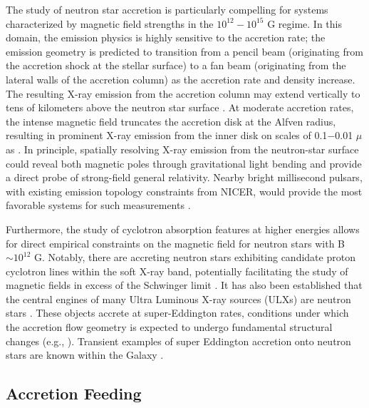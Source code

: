 \documentclass{article}
\begin{document}
The study of neutron star accretion is particularly compelling for systems
characterized by magnetic field strengths in the $10^{12} - 10^{15}$ G regime. In this domain, the
emission physics is highly sensitive to the accretion rate; the emission geometry is
predicted to transition from a pencil beam (originating from the accretion shock at the
stellar surface) to a fan beam (originating from the lateral walls of the accretion
column) as the accretion rate and density increase. The resulting X-ray emission from the
accretion column may extend vertically to tens of kilometers above the neutron star
surface \cite{Basko76,BeckerWolff07}. At moderate accretion rates, the intense magnetic
field truncates the accretion disk at the Alfven radius, resulting in prominent X-ray
emission from the inner disk on scales of 0.1$-$0.01 $\mu$as
\cite{2010_a0535_fek,2026_herx1_fek}. In principle, spatially resolving X-ray emission from the neutron-star surface could reveal both magnetic poles through gravitational light bending and provide a direct probe of strong-field general relativity.  Nearby bright millisecond pulsars, with existing emission topology constraints from NICER, would provide the most favorable systems for such measurements \cite{psrj0437_nicer}. %

Furthermore, the study of cyclotron absorption
features at higher energies allows for direct empirical constraints on the magnetic field
for neutron stars with B $\sim 10^{12}$  G. Notably, there are accreting neutron stars exhibiting
candidate proton cyclotron lines within the soft X-ray band, potentially facilitating the study of magnetic fields in excess of the Schwinger limit \cite{2019staubert_cyc}. It has also
been established that the central engines of many Ultra Luminous X-ray sources (ULXs) are
neutron stars \cite{Bachetti14,furst16,israel17}. These objects accrete at super-Eddington
rates, conditions under which the accretion flow geometry is expected to undergo
fundamental structural changes (e.g., \cite{2017_mushtukov}).  Transient examples of super
Eddington accretion onto neutron stars are known within the Galaxy
\cite{2019_tao_swj0243,2022_liu_swj0243}.




\subsection{Accretion Feeding}  
\end{document}
